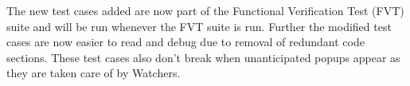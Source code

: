 The new test cases added are now part of the Functional Verification Test (FVT) suite and will be run whenever the FVT suite is run. Further the modified test cases are now easier to read and debug due to removal of redundant code sections. These test cases also don't break when unanticipated popups appear as they are taken care of by Watchers.\\